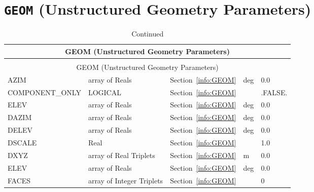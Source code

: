\documentclass[12pt]{article}
\begin{document}
\vspace{\baselineskip}




\section{\texorpdfstring{{\tt GEOM}}{GEOM} (Unstructured Geometry Parameters)}

\begin{longtable}{@{\extracolsep{\fill}}|l|l|l|l|l|}
\caption[Unstructured geometry parameters ({\ct GEOM} namelist group)]{For more information see Section~\ref{info:GEOM}.}
\label{tbl:GEOM} \\
\hline
\multicolumn{5}{|c|}{{\ct GEOM} (Unstructured Geometry Parameters)} \\
\hline \hline
\endfirsthead
\caption[]{Continued} \\
\hline
\multicolumn{5}{|c|}{{\ct GEOM} (Unstructured Geometry Parameters)} \\
\hline \hline
\endhead
{\ct AZIM}         & array of Reals                & Section~\ref{info:GEOM}            &  deg      &    0.0                   \\ \hline
{\ct COMPONENT\_ONLY}     & LOGICAL                & Section~\ref{info:GEOM}            &           &  {\ct .FALSE.}           \\ \hline
{\ct ELEV}         & array of Reals                & Section~\ref{info:GEOM}            &  deg      &    0.0                   \\ \hline
{\ct DAZIM}        & array of Reals                & Section~\ref{info:GEOM}            &  deg      &    0.0                   \\ \hline
{\ct DELEV}        & array of Reals                & Section~\ref{info:GEOM}            &  deg      &    0.0                   \\ \hline
{\ct DSCALE}       & Real                          & Section~\ref{info:GEOM}            &           &   1.0                    \\ \hline
{\ct DXYZ}         & array of Real Triplets        & Section~\ref{info:GEOM}            &   m       &   0.0                    \\ \hline
{\ct ELEV}         & array of Reals                & Section~\ref{info:GEOM}            &  deg      &    0.0                   \\ \hline
{\ct FACES}        & array of Integer Triplets     & Section~\ref{info:GEOM}            &           &    0                     \\ \hline

\end{longtable}
\end{document}
